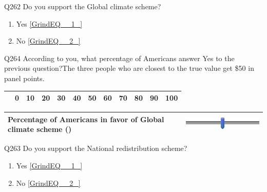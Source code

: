 \documentclass{article} %
\begin{document}
\noindent 

\noindent 

\noindent 

\noindent Q262 Do you support the Global climate scheme?

\begin{enumerate}
\item  Yes  \eqref{GrindEQ__1_} 

\item  No  \eqref{GrindEQ__2_} 
\end{enumerate}

\noindent 

\noindent 

\noindent 

\noindent Q264 According to you, what percentage of Americans answer Yes to the previous question?The three people who are closest to the true value get \$50 in panel points.

\begin{tabular}{|p{2.2in}|p{0.2in}|p{0.2in}|p{0.2in}|p{0.2in}|p{0.2in}|p{0.2in}|p{0.2in}|p{0.2in}|p{0.2in}|p{0.2in}|p{0.2in}|} \hline 
 & 0 & 10 & 20 & 30 & 40 & 50 & 60 & 70 & 80 & 90 & 100 \\ \hline 
\end{tabular}



\begin{tabular}{|p{2.2in}|p{2.2in}|} \hline 
Percentage of Americans in favor of Global climate scheme () & \includegraphics*[width=2.08in, height=0.33in]{image7} \\ \hline 
\end{tabular}



\noindent 

\noindent 

\noindent 

\noindent Q263 Do you support the National redistribution scheme?

\begin{enumerate}
\item  Yes  \eqref{GrindEQ__1_} 

\item  No  \eqref{GrindEQ__2_} 
\end{enumerate}

\noindent 

\noindent 
\end{document}
